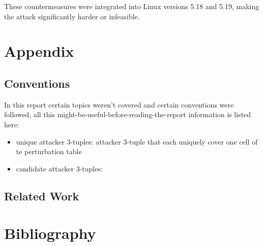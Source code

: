 \documentclass{report}
\begin{document}
These countermeasures were integrated into Linux versions 5.18 and 5.19, making the attack significantly harder or infeasible.

\vspace{0.5cm}
\chapter{Appendix}
\label{sec:appendix}

\section{Conventions}
\label{sec:conventions}

In this report certain topics weren't covered and certain conventions were followed, all this might-be-useful-before-reading-the-report information is listed here:
\begin{itemize}
	\item \alert{unique attacker 3-tuples}: attacker 3-tuple that each uniquely cover one cell of te perturbation table
	\item \alert{candidate attacker 3-tuples}:
\end{itemize}

\section{Related Work}
\label{sec:related work}

\vspace{0.5cm}
\chapter{Bibliography}
\label{sec:bibliography}

\printbibliography[heading=none]

\end{document}
